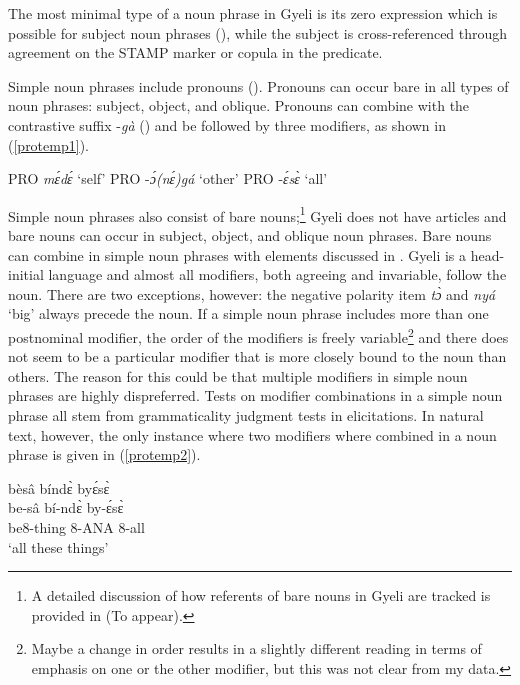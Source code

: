The most minimal type of a noun phrase in Gyeli is its zero expression which is possible for subject noun phrases (), while the subject is cross-referenced through agreement on the STAMP marker or copula in the predicate.

Simple noun phrases include pronouns (). Pronouns can occur bare in all types of noun phrases: subject, object, and oblique. Pronouns can combine with the contrastive suffix -{\itshape gà} () and be followed by three modifiers, as shown in (\ref{protemp1}). 

\begin{exe}
\ex\label{protemp1}
\begin{xlist}
\ex PRO {\itshape mɛ́dɛ́} `self'
\ex PRO -{\itshape ɔ́(nɛ́)gá} `other'
\ex PRO -{\itshape ɛ́sɛ̀} `all'
\end{xlist}
\end{exe}

Simple noun phrases also consist of bare nouns;\footnote{A detailed discussion of how referents of bare nouns in Gyeli are tracked is provided in \citeauthor{grimmforthb} (To appear).} Gyeli does not have articles and bare nouns can occur in subject, object, and oblique noun phrases. Bare nouns can combine in simple noun phrases with elements discussed in . Gyeli is a head-initial language and almost all modifiers, both agreeing and invariable, follow the noun. There are two exceptions, however: the negative polarity item {\itshape tɔ̀} and {\itshape nyá} `big' always precede the noun. If a simple noun phrase includes more than one postnominal modifier, the order of the modifiers is freely variable\footnote{Maybe a change in order results in a slightly different reading in terms of emphasis on one or the other modifier, but this was not clear from my data.} and there does not seem to be a particular modifier that is more closely bound to the noun than others. The reason for this could be that multiple modifiers in simple noun phrases are highly dispreferred. Tests on modifier combinations in a simple noun phrase all stem from grammaticality judgment tests in elicitations. In natural text, however, the only instance where two modifiers where combined in a noun phrase is given in (\ref{protemp2}).

\begin{exe}
\ex\label{protemp2}
 \glll  bèsâ bíndɛ̀ byɛ́sɛ̀ \\
be-sâ bí-ndɛ̀ by-ɛ́sɛ̀ \\
be8-thing 8-ANA 8-all \\
 \trans `all these things'
\end{exe}

